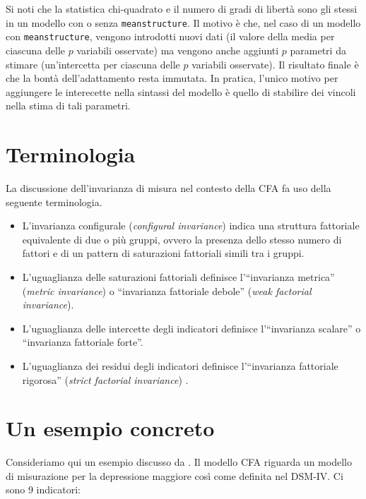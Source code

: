 \documentclass[
  11pt,
]{krantz}
\providecommand{\tightlist}{%
  \setlength{\itemsep}{0pt}\setlength{\parskip}{0pt}}
\theoremstyle{definition}
\theoremstyle{definition}
\theoremstyle{definition}
\theoremstyle{definition}
\theoremstyle{remark}
\begin{document}
Si noti che la statistica chi-quadrato e il numero di gradi di libertà sono gli stessi in un modello con o senza \texttt{meanstructure}. Il motivo è che, nel caso di un modello con \texttt{meanstructure}, vengono introdotti nuovi dati (il valore della media per ciascuna delle \(p\) variabili osservate) ma vengono anche aggiunti \(p\) parametri da stimare (un'intercetta per ciascuna delle \(p\) variabili osservate). Il risultato finale è che la bontà dell'adattamento resta immutata. In pratica, l'unico motivo per aggiungere le interecette nella sintassi del modello è quello di stabilire dei vincoli nella stima di tali parametri.

\hypertarget{terminologia}{%
\section{Terminologia}\label{terminologia}}

La discussione dell'invarianza di misura nel contesto della CFA fa uso della seguente terminologia.

\begin{itemize}
\tightlist
\item
  L'invarianza configurale (\emph{configural invariance}) indica una struttura fattoriale equivalente di due o più gruppi, ovvero la presenza dello stesso numero di fattori e di un pattern di saturazioni fattoriali simili tra i gruppi.
\item
  L'uguaglianza delle saturazioni fattoriali definisce l'``invarianza metrica'' (\emph{metric invariance}) o ``invarianza fattoriale debole'' (\emph{weak factorial invariance}).
\item
  L'uguaglianza delle intercette degli indicatori definisce l'``invarianza scalare'' o ``invarianza fattoriale forte''.
\item
  L'uguaglianza dei residui degli indicatori definisce l'``invarianza fattoriale rigorosa'' (\emph{strict factorial invariance}) .
\end{itemize}

\hypertarget{un-esempio-concreto-3}{%
\section{Un esempio concreto}\label{un-esempio-concreto-3}}

Consideriamo qui un esempio discusso da \citet{brown2015confirmatory}. Il modello CFA riguarda un modello di misurazione per la depressione maggiore così come definita nel DSM-IV. Ci sono 9 indicatori:
\end{document}
